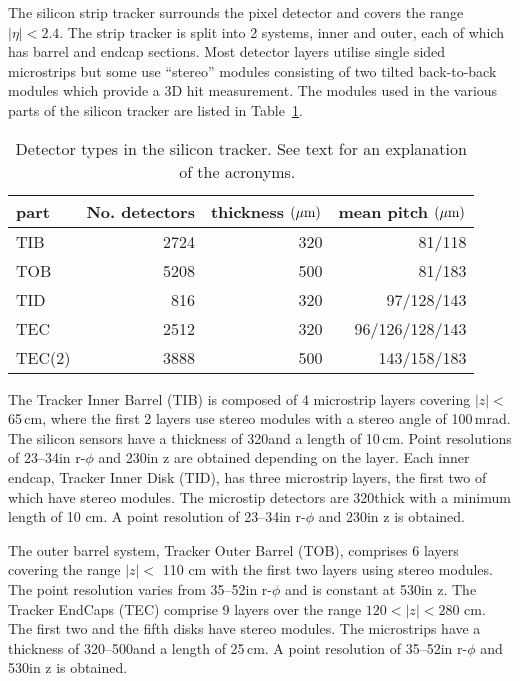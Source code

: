 The silicon strip tracker surrounds the pixel detector and covers the range $|\eta| < 2.4$. The strip tracker is split into 2 systems, inner and outer, each of which has barrel and endcap sections. Most detector layers utilise single sided microstrips but some use ``stereo'' modules consisting of two tilted back-to-back modules which provide a 3D hit measurement. The modules used in the various parts of the silicon tracker are listed in Table~\ref{tab:intro:tracker}.

\begin{table}[!h]
\centering
\begin{tabular}{lrrr}
\hline
part & No. detectors  & thickness $(\mu \mathrm{m})$ & mean pitch $(\mu \mathrm{m})$\\
\hline
TIB & 2724& 320 & 81/118     \\
TOB & 5208& 500 & 81/183     \\
TID & 816& 320 & 97/128/143     \\
TEC & 2512& 320 & 96/126/128/143     \\
TEC(2) & 3888& 500 &  143/158/183    \\
\hline
\end{tabular}
\caption{Detector types in the silicon tracker. See text for an explanation of the acronyms.~\cite{CMS_TDR_PHYS_vol1} \label{tab:intro:tracker}}
\end{table}

The Tracker Inner Barrel (TIB) is composed of 4 microstrip layers covering $|z| <$ 65\,cm, where the first 2 layers use stereo modules with a stereo angle of 100\,mrad. The silicon sensors have a thickness of 320\micron and a length of 10\,cm. Point resolutions of 23--34\micron in r-$\phi$ and 230\micron in z are obtained depending on the layer. Each inner endcap, Tracker Inner Disk (TID), has three microstrip layers, the first two of which have stereo modules. The microstip detectors are 320\micron thick with a minimum length of 10 cm. A point resolution of 23--34\micron in r-$\phi$ and 230\micron in z is obtained.

The outer barrel system, Tracker Outer Barrel (TOB), comprises 6 layers covering the range $|z| <$ 110 cm with the first two layers using stereo modules. The point resolution varies from 35--52\micron in r-$\phi$ and is constant at 530\micron in z. The Tracker EndCaps (TEC) comprise 9 layers over the range $120 < |z| < 280$ cm. The first two and the fifth disks have stereo modules. The microstrips have a thickness of 320--500\micron and a length of 25\,cm. A point resolution of 35--52\micron in r-$\phi$ and 530\micron in z is obtained.

